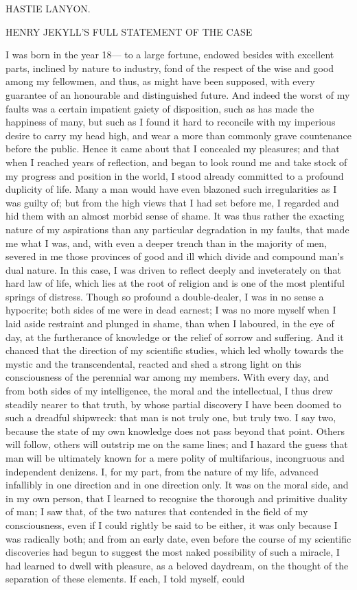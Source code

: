 \documentclass[12pt,openright]{book}
\begin{document}
HASTIE LANYON.

HENRY JEKYLL’S FULL STATEMENT OF THE CASE

I was born in the year 18— to a large fortune, endowed besides with excellent parts, inclined by nature to industry, fond of the respect of the wise and good among my fellowmen, and thus, as might have been supposed, with every guarantee of an honourable and distinguished future. And indeed the worst of my faults was a certain impatient gaiety of disposition, such as has made the happiness of many, but such as I found it hard to reconcile with my imperious desire to carry my head high, and wear a more than commonly grave countenance before the public. Hence it came about that I concealed my pleasures; and that when I reached years of reflection, and began to look round me and take stock of my progress and position in the world, I stood already committed to a profound duplicity of life. Many a man would have even blazoned such irregularities as I was guilty of; but from the high views that I had set before me, I regarded and hid them with an almost morbid sense of shame. It was thus rather the exacting nature of my aspirations than any particular degradation in my faults, that made me what I was, and, with even a deeper trench than in the majority of men, severed in me those provinces of good and ill which divide and compound man’s dual nature. In this case, I was driven to reflect deeply and inveterately on that hard law of life, which lies at the root of religion and is one of the most plentiful springs of distress. Though so profound a double-dealer, I was in no sense a hypocrite; both sides of me were in dead earnest; I was no more myself when I laid aside restraint and plunged in shame, than when I laboured, in the eye of day, at the furtherance of knowledge or the relief of sorrow and suffering. And it chanced that the direction of my scientific studies, which led wholly towards the mystic and the transcendental, reacted and shed a strong light on this consciousness of the perennial war among my members. With every day, and from both sides of my intelligence, the moral and the intellectual, I thus drew steadily nearer to that truth, by whose partial discovery I have been doomed to such a dreadful shipwreck: that man is not truly one, but truly two. I say two, because the state of my own knowledge does not pass beyond that point. Others will follow, others will outstrip me on the same lines; and I hazard the guess that man will be ultimately known for a mere polity of multifarious, incongruous and independent denizens. I, for my part, from the nature of my life, advanced infallibly in one direction and in one direction only. It was on the moral side, and in my own person, that I learned to recognise the thorough and primitive duality of man; I saw that, of the two natures that contended in the field of my consciousness, even if I could rightly be said to be either, it was only because I was radically both; and from an early date, even before the course of my scientific discoveries had begun to suggest the most naked possibility of such a miracle, I had learned to dwell with pleasure, as a beloved daydream, on the thought of the separation of these elements. If each, I told myself, could 
\end{document}
